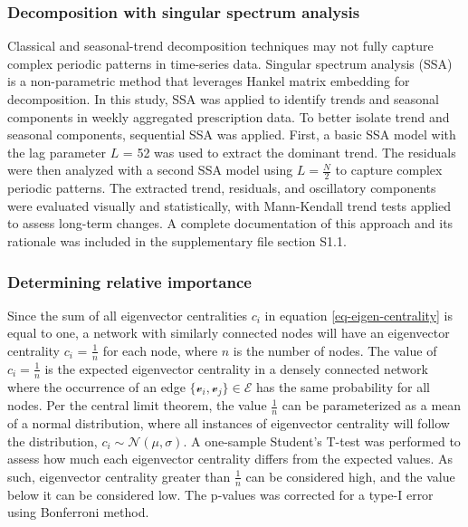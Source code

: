 \documentclass[
  authoryear,
  review]{elsarticle}
\begin{document}
\subsubsection{Decomposition with singular spectrum
analysis}\label{decomposition-with-singular-spectrum-analysis}

Classical and seasonal-trend decomposition techniques may not fully
capture complex periodic patterns in time-series data. Singular spectrum
analysis (SSA) is a non-parametric method that leverages Hankel matrix
embedding for decomposition. In this study, SSA was applied to identify
trends and seasonal components in weekly aggregated prescription data.
To better isolate trend and seasonal components, sequential SSA was
applied. First, a basic SSA model with the lag parameter \(L\) = 52 was
used to extract the dominant trend. The residuals were then analyzed
with a second SSA model using \(L = \frac{N}{2}\) to capture complex
periodic patterns. The extracted trend, residuals, and oscillatory
components were evaluated visually and statistically, with Mann-Kendall
trend tests applied to assess long-term changes. A complete
documentation of this approach and its rationale was included in the
supplementary file section S1.1.

\subsubsection{Determining relative
importance}\label{determining-relative-importance}

Since the sum of all eigenvector centralities \(c_i\) in equation
\ref{eq-eigen-centrality} is equal to one, a network with similarly
connected nodes will have an eigenvector centrality \(c_i\) =
\(\frac{1}{n}\) for each node, where \(n\) is the number of nodes. The
value of \(c_i = \frac{1}{n}\) is the expected eigenvector centrality in
a densely connected network where the occurrence of an edge
\(\{\mathcal{v}_i, \mathcal{v}_j\} \in \mathcal{E}\) has the same
probability for all nodes. Per the central limit theorem, the value
\(\frac{1}{n}\) can be parameterized as a mean of a normal distribution,
where all instances of eigenvector centrality will follow the
distribution, \(c_i \sim \mathcal{N}(\mu, \sigma)\). A one-sample
Student's T-test was performed to assess how much each eigenvector
centrality differs from the expected values. As such, eigenvector
centrality greater than \(\frac{1}{n}\) can be considered high, and the
value below it can be considered low. The p-values was corrected for a
type-I error using Bonferroni method.
\end{document}
